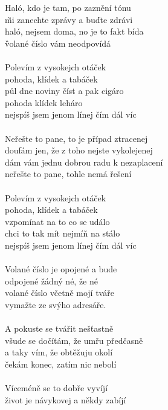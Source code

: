 
\begin{multicols}{2}
\D Haló, kdo je tam, po zaznění tónu\\
\G mi zanechte zprávy \A a buďte zdrávi\\
\D haló, nejsem doma, no je to fakt bída\\
\G volané číslo vám \A neodpovídá\\
\\
\Emi Polevím z vysokejch \A otáček\\
\DmajSedm pohoda, klídek a \Hmi tabáček\\
půl dne \Emi noviny číst a pak \A cigáro\\
\DmajSedm pohoda klídek \Hmi leháro\\
\Emi nejspíš jsem jenom \A línej čím dál \D víc\\
\\
Neřešte to pane, to je případ ztracenej\\
doufám jen, že z toho nejste vykolejenej\\
dám vám jednu dobrou radu k nezaplacení\\
neřešte to pane, tohle nemá řešení\\
\\
Polevím z vysokejch otáček\\
pohoda, klídek a tabáček\\
vzpomínat na to co se událo\\
chci to tak mít nejmíň na stálo\\
nejspíš jsem jenom línej čím dál víc\\
\\
Volané číslo je opojené a bude\\
odpojené žádný né, že né\\
volané číslo včetně mojí tváře\\
vymažte ze svýho adresáře.\\
\\
A pokuste se tvářit nešťastně\\
všude se dočítám, že umřu předčasně\\
a taky vím, že obtěžuju okolí\\
čekám konec, zatím nic nebolí\\
\\
Víceméně se to dobře vyvíjí\\
život je návykovej a někdy zabíjí\\
\\
\ESiroky{}  \ASiroky{}  \HaSiroky{}
\ESiroky{}  \ASiroky{}  \HaSiroky{} 


\end{multicols}
